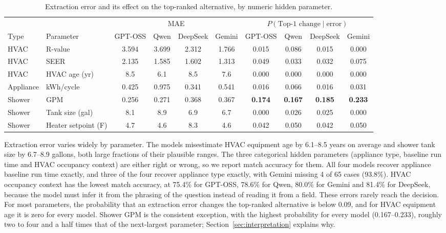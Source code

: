 \documentclass[final,3p,times]{elsarticle}
\begin{document}
\begin{table}[htbp]
\caption{Extraction error and its effect on the top-ranked alternative, by numeric hidden parameter.}
\label{tab:extraction_accuracy}
\centering
\begin{threeparttable}
\centering
\footnotesize
\renewcommand{\arraystretch}{1.15}
\setlength{\tabcolsep}{4pt}
\begin{tabular}{llcccccccc}
\toprule
 & & \multicolumn{4}{c}{MAE} & \multicolumn{4}{c}{$P(\text{Top-1 change} \mid \text{error})$} \\
\cmidrule(lr){3-6}\cmidrule(lr){7-10}
Type & Parameter & GPT-OSS & Qwen & DeepSeek & Gemini & GPT-OSS & Qwen & DeepSeek & Gemini \\
\midrule
HVAC & R-value & 3.594 & 3.699 & 2.312 & 1.766 & 0.015 & 0.086 & 0.015 & 0.000 \\
HVAC & SEER & 2.135 & 1.585 & 1.602 & 1.313 & 0.049 & 0.033 & 0.032 & 0.075 \\
HVAC & HVAC age (yr) & 8.5 & 6.1 & 8.5 & 7.6 & 0.000 & 0.000 & 0.000 & 0.000 \\
Appliance & kWh/cycle & 0.425 & 0.975 & 0.341 & 0.541 & 0.016 & 0.066 & 0.016 & 0.031 \\
Shower & GPM & 0.256 & 0.271 & 0.368 & 0.367 & \textbf{0.174} & \textbf{0.167} & \textbf{0.185} & \textbf{0.233} \\
Shower & Tank size (gal) & 8.1 & 8.9 & 6.9 & 6.7 & 0.000 & 0.026 & 0.025 & 0.000 \\
Shower & Heater setpoint (\textdegree{}F) & 4.7 & 4.6 & 8.3 & 4.6 & 0.042 & 0.050 & 0.042 & 0.050 \\
\bottomrule
\end{tabular}
\setlength{\tabcolsep}{6pt}
\renewcommand{\arraystretch}{1.0}
\end{threeparttable}
\end{table}

Extraction error varies widely by parameter. The models misestimate HVAC equipment age by 6.1--8.5 years on average and shower tank size by 6.7--8.9 gallons, both large fractions of their plausible ranges. The three categorical hidden parameters (appliance type, baseline run time and HVAC occupancy context) are either right or wrong, so we report match accuracy for them. All four models recover appliance baseline run time exactly, and three of the four recover appliance type exactly, with Gemini missing 4 of 65 cases (93.8\%). HVAC occupancy context has the lowest match accuracy, at 75.4\% for GPT-OSS, 78.6\% for Qwen, 80.0\% for Gemini and 81.4\% for DeepSeek, because the model must infer it from the phrasing of the question instead of reading it from a field. These errors rarely reach the decision. For most parameters, the probability that an extraction error changes the top-ranked alternative is below 0.09, and for HVAC equipment age it is zero for every model. Shower GPM is the consistent exception, with the highest probability for every model (0.167--0.233), roughly two to four and a half times that of the next-largest parameter; Section~\ref{sec:interpretation} explains why.
\end{document}
